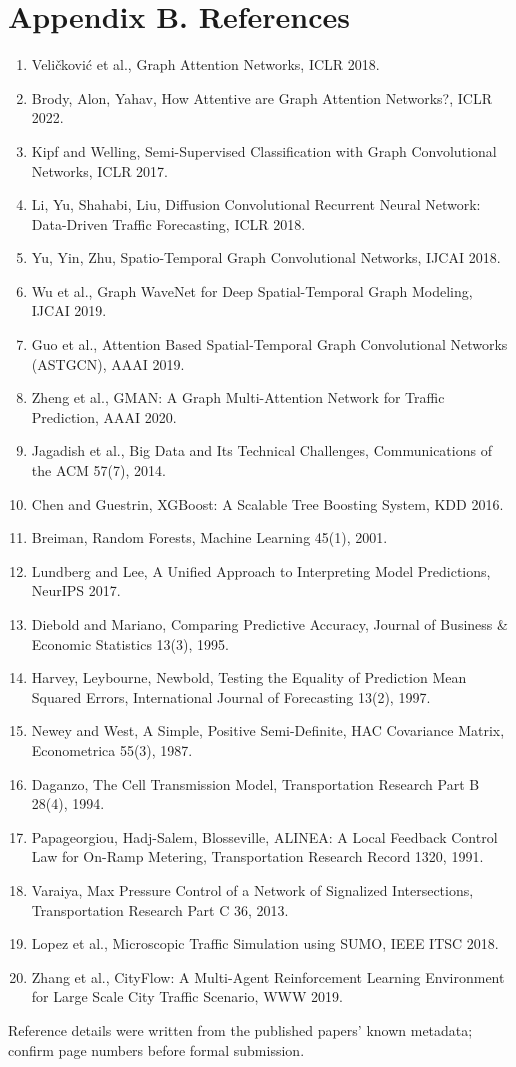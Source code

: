 \documentclass[10pt,a4paper]{article}
\begin{document}
\section*{Appendix B. References}
\begin{enumerate}[nosep,leftmargin=*]
\item Veličković et al., Graph Attention Networks, ICLR 2018.
\item Brody, Alon, Yahav, How Attentive are Graph Attention Networks?, ICLR 2022.
\item Kipf and Welling, Semi-Supervised Classification with Graph Convolutional Networks, ICLR 2017.
\item Li, Yu, Shahabi, Liu, Diffusion Convolutional Recurrent Neural Network: Data-Driven Traffic Forecasting, ICLR 2018.
\item Yu, Yin, Zhu, Spatio-Temporal Graph Convolutional Networks, IJCAI 2018.
\item Wu et al., Graph WaveNet for Deep Spatial-Temporal Graph Modeling, IJCAI 2019.
\item Guo et al., Attention Based Spatial-Temporal Graph Convolutional Networks (ASTGCN), AAAI 2019.
\item Zheng et al., GMAN: A Graph Multi-Attention Network for Traffic Prediction, AAAI 2020.
\item Jagadish et al., Big Data and Its Technical Challenges, Communications of the ACM 57(7), 2014.
\item Chen and Guestrin, XGBoost: A Scalable Tree Boosting System, KDD 2016.
\item Breiman, Random Forests, Machine Learning 45(1), 2001.
\item Lundberg and Lee, A Unified Approach to Interpreting Model Predictions, NeurIPS 2017.
\item Diebold and Mariano, Comparing Predictive Accuracy, Journal of Business \& Economic Statistics 13(3), 1995.
\item Harvey, Leybourne, Newbold, Testing the Equality of Prediction Mean Squared Errors, International Journal of Forecasting 13(2), 1997.
\item Newey and West, A Simple, Positive Semi-Definite, HAC Covariance Matrix, Econometrica 55(3), 1987.
\item Daganzo, The Cell Transmission Model, Transportation Research Part B 28(4), 1994.
\item Papageorgiou, Hadj-Salem, Blosseville, ALINEA: A Local Feedback Control Law for On-Ramp Metering, Transportation Research Record 1320, 1991.
\item Varaiya, Max Pressure Control of a Network of Signalized Intersections, Transportation Research Part C 36, 2013.
\item Lopez et al., Microscopic Traffic Simulation using SUMO, IEEE ITSC 2018.
\item Zhang et al., CityFlow: A Multi-Agent Reinforcement Learning Environment for Large Scale City Traffic Scenario, WWW 2019.
\end{enumerate}

Reference details were written from the published papers' known metadata; confirm page numbers before formal submission.
\end{document}
